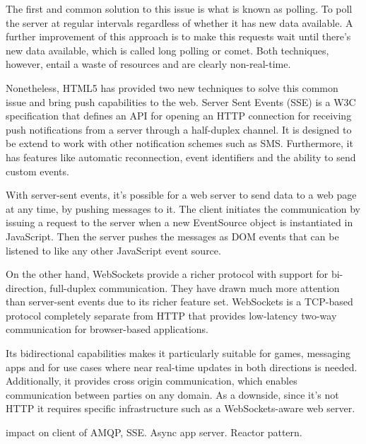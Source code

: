 The first and common solution to this issue is what is known as polling. To poll the server at regular intervals regardless of whether it has new data available. A further improvement of this approach is to make this requests wait until there's new data available, which is called long polling or comet. Both techniques, however, entail a waste of resources and are clearly non-real-time.

Nonetheless, HTML5 has provided two new techniques to solve this common issue and bring push capabilities to the web. Server Sent Events (SSE) is a W3C specification that defines an API for opening an HTTP connection for receiving push notifications from a server through a half-duplex channel. It is designed to be extend to work with other notification schemes such as SMS. \cite{http://www.w3.org/TR/2012/CR-eventsource-20121211/} Furthermore, it has features like automatic reconnection, event identifiers and the ability to send custom events.

With server-sent events, it's possible for a web server to send data to a web page at any time, by pushing messages to it. The client initiates the communication by issuing a request to the server when a new EventSource object is instantiated in JavaScript. Then the server pushes the messages as DOM events that can be listened to like any other JavaScript event source.

On the other hand, WebSockets provide a richer protocol with support for bi-direction, full-duplex communication. They have drawn much more attention than server-sent events due to its richer feature set. WebSockets is a TCP-based protocol \cite{http://tools.ietf.org/html/rfc6455} completely separate from HTTP that provides low-latency two-way communication for browser-based applications.

Its bidirectional capabilities makes it particularly suitable for games, messaging apps and for use cases where near real-time updates in both directions is needed. Additionally, it provides cross origin communication, which enables communication between parties on any domain. As a downside, since it's not HTTP it requires specific infrastructure such as a WebSockets-aware web server.

impact on client of AMQP, SSE. Async app server. Reactor pattern.
